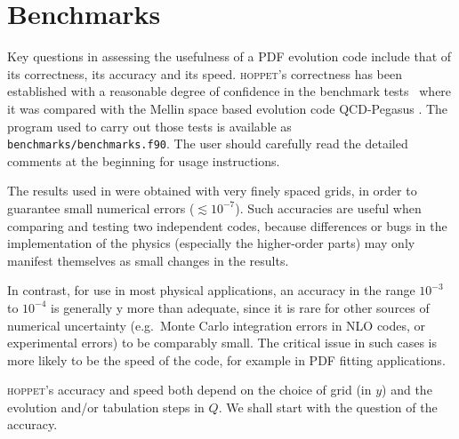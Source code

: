 \documentclass[12pt]{article}
\newcommand{\eg}{e.g.\ }
\newcommand{\hoppet}{\textsc{hoppet}\xspace}
\newcommand{\ttt}[1]{\texttt{#1}}
\begin{document}
\section{Benchmarks}
\label{sec:benchmarks}

Key questions in assessing the usefulness of a PDF evolution code include
that of its correctness, its accuracy and its speed. \hoppet's
correctness has been established with a reasonable degree of
confidence in the benchmark tests~\cite{Benchmarks} where it was
compared with the Mellin space based
evolution code QCD-Pegasus \cite{Pegasus}. 
The program used to carry out those tests
is available as \ttt{benchmarks/benchmarks.f90}. The user should
carefully read the detailed
comments at the beginning for usage instructions.

The results used in \cite{Benchmarks} were obtained with very finely
spaced grids, in order to guarantee small numerical errors ($\lesssim
10^{-7}$).  Such accuracies are useful when comparing and testing two
independent codes, because differences or bugs in the
implementation of the physics (especially the higher-order parts) may
only manifest themselves as small changes in the results.

In contrast, for use in most physical applications, an accuracy in the
range $10^{-3}$ to $10^{-4}$ is generally y more than adequate, since it
is rare for other sources of numerical uncertainty (\eg Monte Carlo
integration errors in NLO codes, or experimental errors) to be
comparably small. The critical issue in such cases is more likely to
be the speed of the code, for example in PDF fitting
applications.

\hoppet's accuracy and speed both depend on the choice of grid (in
$y$) and the evolution and/or tabulation steps in $Q$. We shall start
with the question of the accuracy.


\end{document}
